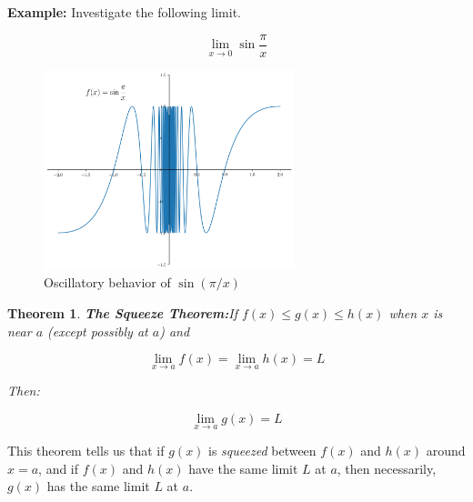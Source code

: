\documentclass[a4paper,11pt]{article}
\theoremstyle{definition}
\theoremstyle{plain}
\newtheorem{theorem}{Theorem}
\begin{document}
\textbf{Example:} Investigate the following limit.

\[
\lim_{x\rightarrow 0}\sin{\frac{\pi}{x}}
\]

    \begin{figure}[htbp]
    	\centering 
    		\includegraphics[width = 0.65\textwidth]{Ch1_files/Ch1_25_0.png}
    		\caption{Oscillatory behavior of $\sin(\pi/x)$}
    		\label{fig:sin_pi_x}
    \end{figure}


\begin{theorem}{\textbf{The Squeeze Theorem:}}\label{thm:squeeze_thm}
If $f(x)\leq g(x) \leq h(x)$ when $x$ is near $a$ (except possibly at $a$) and

\[
\lim_{x\rightarrow a}f(x) = \lim_{x\rightarrow a}h(x) = L
\]

Then:

\[
\lim_{x\rightarrow a}g(x) = L
\]
\end{theorem}

This theorem tells us that if $g(x)$ is \textit{squeezed} between $f(x)$ and $h(x)$ around $x = a$, and if $f(x)$ and $h(x)$ have the same limit $L$ at $a$, then necessarily, $g(x)$ has the same limit $L$ at $a$.
\end{document}
